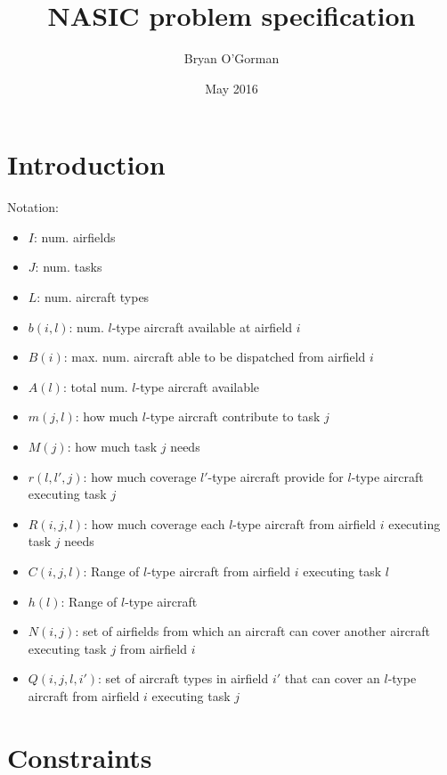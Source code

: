 \documentclass{article}
\title{NASIC problem specification}
\author{Bryan O'Gorman}
\date{May 2016}
\begin{document}
\maketitle

\section{Introduction}
Notation:
\begin{itemize}
    \item $I$: num. airfields
    \item $J$: num. tasks
    \item $L$: num. aircraft types
    \item $b(i, l)$: num. $l$-type aircraft available at airfield $i$
    \item $B(i)$: max. num. aircraft able to be dispatched from airfield $i$
    \item $A(l)$: total num. $l$-type aircraft available
    \item $m(j, l)$: how much $l$-type aircraft contribute to task $j$
    \item $M(j)$: how much task $j$ needs
    \item $r(l, l', j)$: how much coverage $l'$-type aircraft provide for $l$-type aircraft executing task $j$
    \item $R(i, j, l)$: how much coverage each $l$-type aircraft from airfield $i$ executing task $j$ needs
    \item $C(i, j, l)$: Range of $l$-type aircraft from airfield $i$ executing task $l$
    \item $h(l)$: Range of $l$-type aircraft
    \item $N(i, j)$: set of airfields from which an aircraft can cover another aircraft executing task $j$ from airfield $i$  
    \item $Q(i, j, l, i')$: set of aircraft types in airfield $i'$ that can cover an $l$-type aircraft from airfield $i$ executing task $j$
\end{itemize}


\section{Constraints}
\end{document}
